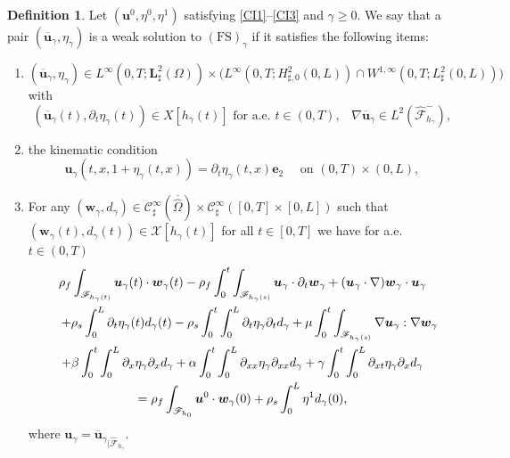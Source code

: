 \documentclass[10pt]{amsart}
\let\mathcal\mathscr
\newenvironment{enumeratei}
{\bgroup\def\theenumi{\roman{enumi}}\def\theenumii{\arabic{enumii}}\begin{enumerate}}
{\end{enumerate}\egroup}
\newcommand{\FS}{\mathrm{FS}}
\theoremstyle{remark}
\theoremstyle{definition}
\newtheorem{definition}[theorem]{Definition}
\newcommand{\ug}{\boldsymbol{u}}
\newcommand{\wg}{\boldsymbol{w}}
\newcommand{\BS}[1]{\boldsymbol{#1}}
\let\CM\Omega
\newcommand{\CMT}{\widehat{\Omega}}
\begin{document}
\begin{definition} \label{def.ws}
Let $(\ug^{0},\eta^{0},\eta^{1})$ satisfying \eqref{CI1}--\eqref{CI3} and $\gamma \geq 0$.
We say that a pair $({\overline{\ug}_\gamma},\eta_\gamma)$ is a weak solution to $(\FS)_\gamma$ if it satisfies the following items:
\begin{enumeratei}
\item\label{def.wsi} $({\overline{\ug}_\gamma},\eta_\gamma)\in L^{\infty}(0,T;\BS{L}_{\sharp}^{2}(\CM))\times \bigl(L^{\infty}(0,T;H^{2}_{\sharp, 0}(0,L))\cap W^{1,\infty}(0,T;L_\sharp^{2}(0,L))\bigr)$ with\vspace*{-3pt}
\[
({\overline{\ug}_\gamma}(t), \partial_t\eta_\gamma(t))\in X[h_\gamma(t)] \text{ for a.e. $t\in(0,T)$,} \quad
\nabla \overline{\ug}_\gamma \in L^{2}(\hat{\mathcal{F}}^{-}_{h_\gamma}),
\]
\item\label{def.wsii} the kinematic condition
\[
\ug_\gamma(t, x, 1+\eta_\gamma(t, x))=\partial_t\eta_\gamma(t,x) \BS{e}_2 \quad \textrm{ on } (0, T) \times (0, L),
\]
\item\label{def.wsiii}
For any $(\wg_\gamma, d_\gamma)\in \mathcal{C}_\sharp^{\infty}\left(\overline{\CMT}\right)\times\mathcal{C}_\sharp^{\infty}( [0, T]\times[0, L] )$ such that $(\wg_\gamma(t), d_\gamma(t))\in\mathcal{X}[h_\gamma(t)]$ for all $t\in [0,T]$ we have for a.e. $t\in(0,T)$
\begin{multline}\label{weak.formulation.FS}
\rho_{f}\int_{\mathcal{F}_{h_\gamma(t)}}\ug_\gamma(t)\cdot\wg_\gamma(t) -\rho_{f}\int_{0}^{t}\int_{\mathcal{F}_{h_\gamma(s)}}\ug_\gamma\cdot\partial_{t}\wg_\gamma + (\ug_\gamma\cdot\nabla)\wg_\gamma\cdot\ug_\gamma\\
\hspace*{4mm}+\rho_{s}\int_{0}^{L}\partial_{t}\eta_\gamma(t)d_\gamma(t)-\rho_{s}\int_{0}^{t}\int_{0}^{L}\partial_{t}\eta_\gamma\partial_{t}d_\gamma+\mu\int_{0}^{t}\int_{\mathcal{F}_{h_\gamma(s)}} \nabla\ug_\gamma:\nabla\wg_\gamma\\
+\beta\int_{0}^{t}\int_{0}^{L}\partial_{x}\eta_\gamma\partial_{x}d_\gamma + \alpha\int_{0}^{t}\int_{0}^{L}\partial_{xx}\eta_\gamma\partial_{xx}d_\gamma+\gamma\int_{0}^{t}\int_{0}^{L}\partial_{xt}\eta_\gamma\partial_{x}d_\gamma \\
=\rho_{f}\int_{\mathcal{F}_{h_0}}\ug^{0}\cdot\wg_\gamma(0)+\rho_{s}\int_{0}^{L}\eta^{1}d_\gamma(0),
\end{multline}
where $\ug_\gamma={\overline{\ug}_\gamma}_{\vert \widehat{\mathcal{F}}_{h_\gamma}}$.
\end{enumeratei}
\end{definition}
\end{document}

